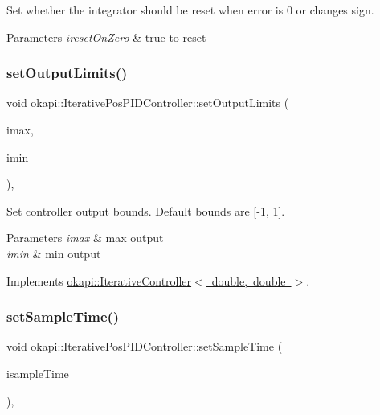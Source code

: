 Set whether the integrator should be reset when error is 0 or changes sign.


\begin{DoxyParams}{Parameters}
{\em ireset\+On\+Zero} & true to reset \\
\hline
\end{DoxyParams}
\mbox{\label{classokapi_1_1IterativePosPIDController_a64c3fddb91ceaac4e747404afc5295ae}} 
\subsubsection{\texorpdfstring{setOutputLimits()}{setOutputLimits()}}
{\footnotesize\ttfamily void okapi\+::\+Iterative\+Pos\+P\+I\+D\+Controller\+::set\+Output\+Limits (\begin{DoxyParamCaption}\item[{double}]{imax,  }\item[{double}]{imin }\end{DoxyParamCaption})\hspace{0.3cm}{\ttfamily [override]}, {\ttfamily [virtual]}}

Set controller output bounds. Default bounds are \mbox{[}-\/1, 1\mbox{]}.


\begin{DoxyParams}{Parameters}
{\em imax} & max output \\
\hline
{\em imin} & min output \\
\hline
\end{DoxyParams}


Implements \mbox{\hyperlink{classokapi_1_1IterativeController_ae1a7d9bd29d176a26bcc70c741f0d50f}{okapi\+::\+Iterative\+Controller$<$ double, double $>$}}.

\mbox{\label{classokapi_1_1IterativePosPIDController_a89e9f71510b9779282175fe3f5b071d6}} 
\subsubsection{\texorpdfstring{setSampleTime()}{setSampleTime()}}
{\footnotesize\ttfamily void okapi\+::\+Iterative\+Pos\+P\+I\+D\+Controller\+::set\+Sample\+Time (\begin{DoxyParamCaption}\item[{Q\+Time}]{isample\+Time }\end{DoxyParamCaption})\hspace{0.3cm}{\ttfamily [override]}, {\ttfamily [virtual]}}

